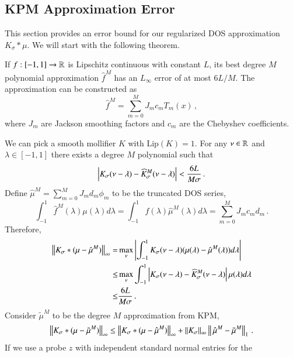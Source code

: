 \subsection{KPM Approximation Error}
This section provides an error bound for our regularized DOS approximation
$K_\sigma\ast\mu$. We will start with the following theorem.
\begin{theorem}
\label{thm:Jackson_damping}
	If $f:[-1,1]\rightarrow \mathbb{R}$ is Lipschitz continuous with constant $L$, its
	best degree $M$ polynomial approximation $\hat{f}^M$ has an $L_\infty$ 
	error of at most $6L/M$. The approximation can be constructed as
	\begin{equation}
		\hat{f}^M = \sum_{m=0}^MJ_mc_mT_m(x)\,,
	\end{equation}
	where $J_m$ are Jackson smoothing factors and $c_m$ are the Chebyshev
	coefficients.
\end{theorem}
We can pick a smooth mollifier $K$ with $\text{Lip}(K)=1$. For any $\nu\in\mathbb{R}$
and $\lambda\in [-1,1]$ there exists a degree $M$ polynomial such that 
\begin{equation}
	\left\lvert K_\sigma(\nu-\lambda)-\widehat{K}^{M}_\sigma(\nu-\lambda)\right\rvert < \frac{6L}
	{M\sigma}\,.
\end{equation}
Define $\hat{\mu}^M = \sum_{m=0}^MJ_md_m\phi_m$ to be the truncated DOS
series,
\begin{equation}
	\int_{-1}^1 \hat{f}^M(\lambda)\mu(\lambda)d\lambda = \int_{-1}^1f
	(\lambda)\hat{\mu}^M(\lambda)d\lambda = \sum_{m=0}^MJ_mc_md_m\,.
\end{equation}
Therefore,
\begin{align*}
	\left\lVert K_\sigma\ast(\mu-\hat{\mu}^M)\right\rVert_\infty
	=& \max_\nu\left\lvert\int_{-1}^1K_\sigma(\nu-\lambda)(\mu(\lambda)-\hat{\mu}^M 
	(\lambda))d\lambda\right\rvert\\
	\leq& \max_\nu\int_{-1}^1\left\lvert K_\sigma(\nu-\lambda)-\widehat{K}^M_\sigma
	(\nu-\lambda)\right\rvert\mu(\lambda)d\lambda \\
	\leq& \frac{6L}{M\sigma}\,.
\end{align*}
Consider $\tilde{\mu}^M$ to be the degree $M$ approximation from KPM,
\begin{equation}
	\left\lVert K_\sigma\ast(\mu-\tilde{\mu}^M)\right\rVert_\infty \leq \left\lVert K_\sigma\ast(\mu- 
	\hat{\mu}^M)\right\rVert_\infty+ \left\lVert K_\sigma\right\rVert_\infty\left\lVert\,\hat{\mu}^M - 
	\tilde{\mu}^M\right\rVert_1\,.
\end{equation}
If we use a probe $z$ with independent standard normal entries for the
